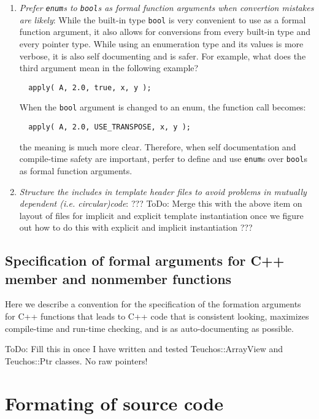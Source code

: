 \begin{enumerate}
{}\item\textit{Prefer {}\texttt{enum}s to {}\texttt{bool}s as formal function
arguments when convertion mistakes are likely}: While the built-in type
{}\texttt{bool} is very convenient to use as a formal function argument, it
also allows for conversions from every built-in type and every pointer type.
While using an enumeration type and its values is more verbose, it is also
self documenting and is safer.  For example, what does the third argument mean
in the following example?

{\small\begin{verbatim}
  apply( A, 2.0, true, x, y );
\end{verbatim}}

When the {}\texttt{bool} argument is changed to an enum, the function call
becomes:

{\small\begin{verbatim}
  apply( A, 2.0, USE_TRANSPOSE, x, y );
\end{verbatim}}

the meaning is much more clear.  Therefore, when self documentation and
compile-time safety are important, perfer to define and use {}\texttt{enum}s
over {}\texttt{bool}s as formal function arguments.

{}\item\textit{Structure the includes in template header files to avoid
problems in mutually dependent (i.e. circular)code}: ??? ToDo: Merge this with
the above item on layout of files for implicit and explicit template
instantiation once we figure out how to do this with explicit and implicit
instantiation ???

\end{enumerate}

%
\subsection{Specification of formal arguments for C++ member and nonmember functions}
%

Here we describe a convention for the specification of the formation arguments
for C++ functions that leads to C++ code that is consistent looking, maximizes
compile-time and run-time checking, and is as auto-documenting as possible.

ToDo: Fill this in once I have written and tested Teuchos::ArrayView and
Teuchos::Ptr classes.  No raw pointers!
%
\section{Formating of source code}
\label{thyracodingguidelines:formatting:sec}
%


